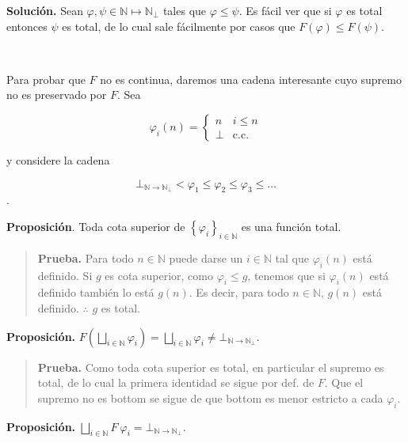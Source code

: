 \documentclass[article, 12pt]{article}
\begin{document}
\textbf{Solución.} Sean $\varphi, \psi \in \mathbb{N} \mapsto \mathbb{N}_\bot $
tales que $\varphi \leq \psi$. Es fácil ver que si $\varphi$ es total entonces
$\psi$ es total, de lo cual sale fácilmente por casos que $F(\varphi) \leq
F(\psi)$.

~

Para probar que $F$ no es continua, daremos una cadena interesante cuyo supremo
no es preservado por $F$. Sea

\begin{equation*}
  \varphi_i(n) = \begin{cases}
    n & i \leq n \\ 
    \bot & \text{c.c.}
  \end{cases}
\end{equation*}

y considere la cadena 

$$\bot_{\mathbb{N}\to \mathbb{N}_\bot } < \varphi_1 \leq \varphi_2 \leq
\varphi_3 \leq \ldots$$. 

\textbf{Proposición}. Toda cota superior de $\left\{ \varphi_i \right\}_{i \in
\mathbb{N}}$ es una función total.


\small
\begin{quote}


\textbf{Prueba.} Para todo $n \in \mathbb{N}$ puede darse un $i
\in \mathbb{N}$ tal que $\varphi_i(n)$ está definido. Si $g$ es cota superior,
como $\varphi_i \leq g$, tenemos que si $\varphi_i(n)$ está definido también lo
está $g(n)$. Es decir, para todo $n \in \mathbb{N}$, $g(n)$ está definido.
$\therefore $ $g$ es total.

\end{quote}
\normalsize

\textbf{Proposición.} $F\left( \bigsqcup_{i \in \mathbb{N}} \varphi_i \right) =
\bigsqcup_{i \in \mathbb{N}} \varphi_i \neq \bot_{\mathbb{N}\to \mathbb{N}_\bot }$.


\small
\begin{quote}

\textbf{Prueba.} Como toda cota superior es total, en particular el supremo es
total, de lo cual la primera identidad se sigue por def. de $F$. Que el supremo
no es bottom se sigue de que bottom es menor estricto a cada $\varphi_i$.

\end{quote}
\normalsize

\textbf{Proposición.} $\bigsqcup_{i \in \mathbb{N}} F ~ \varphi_i =
\bot_{\mathbb{N} \to \mathbb{N}_\bot }$.
\end{document}
